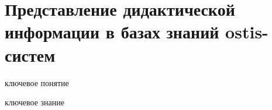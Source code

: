 \section{Представление дидактической информации в базах знаний ostis-систем}
\label{sec_didactic information}

\begin{SCn}
	
	\bigskip
	
	\begin{scnrelfromlist}{ключевое понятие}
	\end{scnrelfromlist}
	
	\bigskip
	
	\begin{scnrelfromlist}{ключевое знание}
	\end{scnrelfromlist}
	
	\bigskip
	

\end{SCn}
